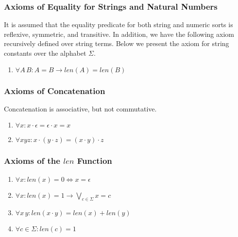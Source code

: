 \subsubsection{Axioms of Equality for Strings and Natural Numbers}

It is assumed that the equality predicate for both string and numeric
sorts is reflexive, symmetric, and transitive. In addition, we have
the following axiom recursively defined over string terms. Below we
present the axiom for string constants over the alphabet $\Sigma$.

\begin{enumerate}[resume]

\item $\forall A \, B : A = B \to len(A) = len(B)$

\end{enumerate}

\subsubsection{Axioms of Concatenation}

Concatenation is associative, but not commutative.

\begin{enumerate}[resume]

\item $\forall x : x \cdot \epsilon = \epsilon \cdot x = x$

\item $\forall xyz : x \cdot (y \cdot z) = (x \cdot y) \cdot z$

\end{enumerate}

\subsubsection{Axioms of the $len$ Function}

\begin{enumerate}[resume]

\item $\forall x : len(x) = 0 \iff x = \epsilon$

\item $\forall x : len(x) = 1 \to \bigvee_{c \in \Sigma} x = c$

\item $\forall x\, y : len(x \cdot y) = len(x) + len(y)$

\item $\forall c \in \Sigma : len(c) = 1$

\end{enumerate}
  
